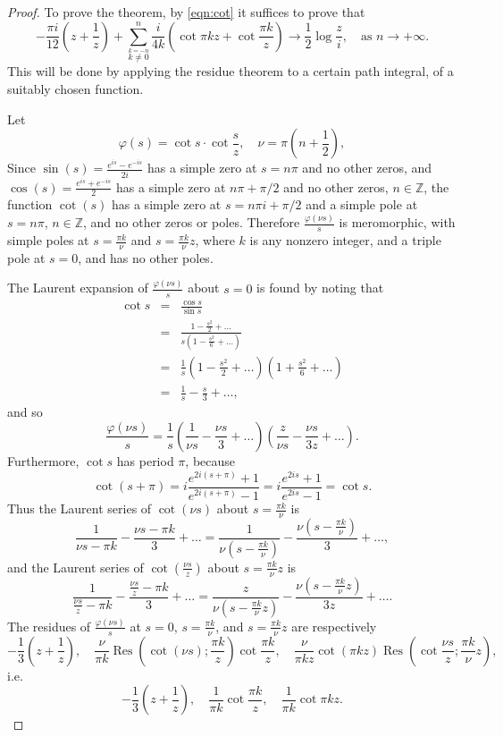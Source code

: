 \documentclass{article}
\DeclareMathOperator{\Res}{Res}
\begin{document}
\begin{proof}
To prove the theorem, by \eqref{eqn:cot} it suffices to prove that
\begin{equation}
\label{eqn:eta5}
-\frac{\pi i}{12}(z+\frac{1}{z})+\sum_{\stackrel{k=-n}{k \neq 0}}^n \frac{i}{4k}(\cot \pi kz+\cot \frac{\pi k}{z})\to \frac{1}{2}\log \frac{z}{i}, \quad \textrm{as $n \to +\infty$}.
\end{equation}
This will be done by applying the residue theorem to a certain path integral, of a suitably chosen function.

Let
\begin{equation}
\varphi(s)=\cot s \cdot \cot \frac{s}{z}, \quad \nu=\pi(n+\frac{1}{2}),
\end{equation}
Since $\sin(s)=\frac{e^{is}-e^{-is}}{2i}$ has a simple zero at $s=n\pi$ and no other zeros,
and $\cos(s)=\frac{e^{is}+e^{-is}}{2}$ has a simple zero at $n\pi+\pi/2$ and no other zeros,
$n \in \mathbb{Z}$, the function $\cot(s)$ has a simple zero at $s=n\pi i+\pi/2$ and a simple pole at $s=n\pi$, $n \in \mathbb{Z}$,
and no other zeros or poles.
Therefore $\frac{\varphi(\nu s)}{s}$ is meromorphic, with simple poles at $s=\frac{\pi k}{\nu}$ and $s=\frac{\pi k}{\nu}z$, where $k$ is any nonzero integer, and a triple pole at $s=0$, and has no other poles.

The Laurent expansion of $\frac{\varphi(\nu s)}{s}$ about $s=0$ is found by noting that
\begin{eqnarray*}
\cot s&=&\frac{\cos s}{\sin s}\\
&=&\frac{1-\frac{s^2}{2}+\ldots}{s(1-\frac{s^2}{6}+\ldots)}\\
&=&\frac{1}{s}(1-\frac{s^2}{2}+\ldots)(1+\frac{s^2}{6}+\ldots)\\
&=&\frac{1}{s}-\frac{s}{3}+\ldots,
\end{eqnarray*}
and so
\[
\frac{\varphi(\nu s)}{s}=\frac{1}{s}(\frac{1}{\nu s}-\frac{\nu s}{3}+\ldots)(\frac{z}{\nu s}-\frac{\nu s}{3z}+\ldots).
\]
Furthermore, $\cot s$ has period $\pi$, because
\[
\cot(s+\pi)=i\frac{e^{2i(s+\pi)}+1}{e^{2i(s+\pi)}-1}=i\frac{e^{2is}+1}{e^{2is}-1}=\cot s.
\]
Thus the Laurent series of $\cot(\nu s)$ about $s=\frac{\pi k}{\nu}$ is
\[
\frac{1}{\nu s-\pi k}-\frac{\nu s-\pi k}{3}+\ldots=\frac{1}{\nu(s-\frac{\pi k}{\nu})}-\frac{\nu(s-\frac{\pi k}{\nu})}{3}+\ldots,
\]
and the Laurent series of $\cot(\frac{\nu s}{z})$ about $s=\frac{\pi k}{\nu}z$ is
\[
\frac{1}{\frac{\nu s}{z}-\pi k}-\frac{\frac{\nu s}{z}-\pi k}{3}+\ldots =\frac{z}{\nu(s-\frac{\pi k}{\nu}z)}-\frac{\nu(s-\frac{\pi k}{\nu}z)}{3z}+\ldots.
\]
The residues of $\frac{\varphi(\nu s)}{s}$ at $s=0$, $s=\frac{\pi k}{\nu}$, and $s=\frac{\pi k}{\nu}z$ are respectively
\[
-\frac{1}{3}(z+\frac{1}{z}),\quad \frac{\nu}{\pi k}\Res(\cot(\nu s);\frac{\pi k}{z})\cot \frac{\pi k}{z},\quad \frac{\nu}{\pi k z}\cot(\pi k z)\Res(\cot \frac{\nu s}{z};\frac{\pi k}{\nu}z),
\]
i.e.
\[
-\frac{1}{3}(z+\frac{1}{z}),\quad \frac{1}{\pi k}\cot \frac{\pi k}{z}, \quad \frac{1}{\pi k}\cot \pi kz.
\]


\end{proof}
\end{document}
